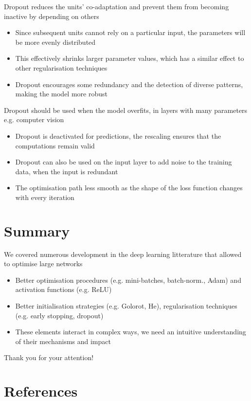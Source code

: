 \documentclass[c]{beamer}
\begin{document}
\begin{frame}{\secsubname}
	Dropout reduces the units' co-adaptation and prevent them from becoming inactive by depending on others
	\begin{itemize}
		\item Since subsequent units cannot rely on a particular input, the parameters will be more evenly distributed
		\item This effectively shrinks larger parameter values, which has a similar effect to other regularisation techniques
		\item Dropout encourages some redundancy and the detection of diverse patterns, making the model more robust
	\end{itemize}
\end{frame}

\begin{frame}{\secsubname}
	Dropout should be used when the model overfits, in layers with many parameters e.g. computer vision
	\begin{itemize}
		\item Dropout is deactivated for predictions, the rescaling ensures that the computations remain valid
		\item Dropout can also be used on the input layer to add noise to the training data, when the input is redundant
		\item The optimisation path less smooth as the shape of the loss function changes with every iteration
	\end{itemize}
\end{frame}

\section{Summary}

\begin{frame}{\secname}
	We covered numerous development in the deep learning litterature that allowed to optimise large networks
	\begin{itemize}
		\item Better optimisation procedures (e.g. mini-batches, batch-norm., Adam) and activation functions (e.g. ReLU)
		\item Better initialisation strategies (e.g. Golorot, He), regularisation techniques (e.g. early stopping, dropout)
		\item These elements interact in complex ways, we need an intuitive understanding of their mechanisms and impact
	\end{itemize}
\end{frame}

\begin{frame}[standout]
	\alert{\LARGE Thank you for your attention!} 
\end{frame}

\section*{References}

\begin{frame}[allowframebreaks]{\secname}
	\nocite{Plevris2022}
	\printbibliography[heading=none]	
\end{frame}
\end{document}
